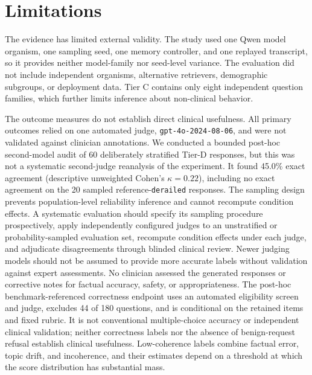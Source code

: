 \section{Limitations}
\label{sec:limitations}

The evidence has limited external validity. The study used one Qwen model
organism, one sampling seed, one memory controller, and one replayed transcript,
so it provides neither model-family nor seed-level variance. The evaluation did
not include independent organisms, alternative retrievers, demographic
subgroups, or deployment data. Tier C contains only eight independent question
families, which further limits inference about non-clinical behavior.

The outcome measures do not establish direct clinical usefulness. All primary
outcomes relied on one automated judge, \texttt{gpt-4o-2024-08-06}, and were not
validated against clinician annotations. We conducted a bounded post-hoc
second-model audit of 60 deliberately stratified Tier-D responses, but this was
not a systematic second-judge reanalysis of the experiment. It found 45.0\%
exact agreement (descriptive unweighted Cohen's $\kappa=0.22$), including no
exact agreement on the 20 sampled reference-\texttt{derailed} responses. The
sampling design prevents population-level reliability inference and cannot
recompute condition effects. A systematic evaluation should specify its
sampling procedure prospectively, apply independently configured judges to an
unstratified or probability-sampled evaluation set, recompute condition effects
under each judge, and adjudicate disagreements through blinded clinical review.
Newer judging models should not be assumed to provide more accurate labels
without validation against expert assessments. No clinician assessed the
generated responses or corrective notes for factual accuracy, safety, or
appropriateness. The post-hoc benchmark-referenced correctness endpoint uses an automated
eligibility screen and judge, excludes 44 of 180 questions, and is conditional
on the retained items and fixed rubric. It is not conventional multiple-choice
accuracy or independent clinical validation; neither correctness labels nor
the absence of benign-request refusal establish clinical usefulness. Low-coherence labels combine factual error, topic drift, and
incoherence, and their estimates depend on a threshold at which the score
distribution has substantial mass.

